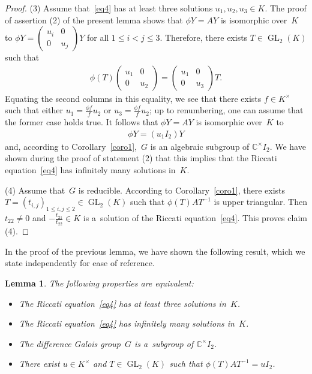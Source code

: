 \documentclass[pdftex]{sigma}
\numberwithin{equation}{section}
\newtheorem{Lemma}[Theorem]{Lemma}
\begin{document}
\begin{proof}
(3) Assume that~\eqref{eq4} has at least three solutions $u_{1},u_{2},u_{3}\in K$.
The proof of assertion (2) of the present lemma shows that $\phi Y=AY$ is isomorphic over~$K$ to $\phi Y=
\begin{pmatrix}
u_{i}&0
\\
0&u_{j}
\end{pmatrix}
Y$ for all $1\leq i<j \leq 3$.
Therefore, there exists $T \in \operatorname{GL}_{2}(K)$ such that
\begin{gather*}
\phi(T)
\begin{pmatrix}
u_{1}&0
\\
0&u_{2}
\end{pmatrix}
=
\begin{pmatrix}
u_{1}&0
\\
0&u_{3}
\end{pmatrix}
T.
\end{gather*}
Equating the second columns in this equality, we see that there exists ${f\in K^{\times}}$ such that either
$u_{1}=\frac{\phi f}{f}u_{2}$ or $u_{3}=\frac{\phi f}{f}u_{2}$; up to renumbering, one can assume that the former case
holds true.
It follows that $\phi Y=AY$ is isomorphic over~$K$ to
\begin{gather*}
\phi Y=(u_{1} I_{2}) Y
\end{gather*}
and, according to Corollary~\ref{coro1},~$G$ is an algebraic subgroup of $\mathbb C^{\times} I_{2}$.
We have shown during the proof of statement (2) that this implies that the Riccati equation~\eqref{eq4} has inf\/initely
many solutions in~$K$.

(4) Assume that~$G$ is reducible.
According to Corollary~\ref{coro1}, there exists $T=(t_{i,j})_{1 \leq i,j\leq 2}\in \operatorname{GL}_{2}(K)$ such that
$\phi(T)AT^{-1}$ is upper triangular.
Then $t_{22}\neq 0$ and $-\frac{t_{21}}{t_{22}}\in K$ is a~solution of the Riccati equation~\eqref{eq4}.
This proves claim (4).
\end{proof}

In the proof of the previous lemma, we have shown the following result, which we state independently for ease of
reference.

\begin{Lemma}
\label{lem ric irred bis}
The following properties are equivalent:
\begin{itemize}\itemsep=0pt
\item The Riccati equation~\eqref{eq4} has at least three solutions in~$K$.
\item The Riccati equation~\eqref{eq4} has infinitely many solutions in~$K$.
\item The difference Galois group~$G$ is a~subgroup of $\mathbb C^{\times}I_{2}$.
\item There exist $u \in K^{\times}$ and $T \in \operatorname{GL}_2(K)$ such that $\phi(T)AT^{-1} = u I_{2}$.
\end{itemize}
\end{Lemma}
\end{document}
